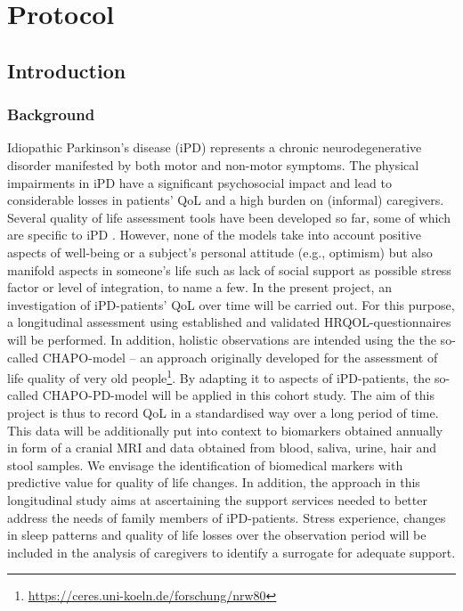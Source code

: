 \chapter{Protocol}
\section{Introduction}
\subsection{Background}
Idiopathic Parkinson's disease (\acs{iPD}) represents a chronic neurodegenerative disorder manifested by both motor and non-motor symptoms. The physical impairments in \ac{iPD} have a significant psychosocial impact and lead to considerable losses in patients'  \ac{QoL} and a high burden on (informal) caregivers. Several quality of life assessment tools have been developed so far, some of which are specific to \ac{iPD} \citep{stuhrenberg2022jpm}. However, none of the models take into account positive aspects of well-being or a subject's personal attitude (e.g., optimism) but also manifold aspects in someone's life such as lack of social support as possible stress factor or level of integration, to name a few. In the present project, an investigation of \ac{iPD}-patients' \ac{QoL} over time will be carried out. For this purpose, a longitudinal assessment using established and validated \ac{HRQOL}-questionnaires will be performed. In addition, holistic observations are intended using the the so-called \ac{CHAPO}-model -- an approach originally developed for the assessment of life quality of very old people\footnote{\url{https://ceres.uni-koeln.de/forschung/nrw80}}. By adapting it to aspects of \ac{iPD}-patients, the so-called \acs{CHAPO}-PD-model \citep{thieken2022jpd} will be applied in this cohort study. The aim of this project is thus to record \ac{QoL} in a standardised way over a long period of time. This data will be additionally put into context to biomarkers obtained annually in form of a cranial \ac{MRI} and data obtained from blood, saliva, urine, hair and stool samples. We envisage the identification of biomedical markers with predictive value for quality of life changes. In addition, the approach in this longitudinal study aims at ascertaining the support services needed to better address the needs of family members of \ac{iPD}-patients. Stress experience, changes in sleep patterns and quality of life losses over the observation period will be included in the analysis of caregivers to identify a surrogate for adequate support.

